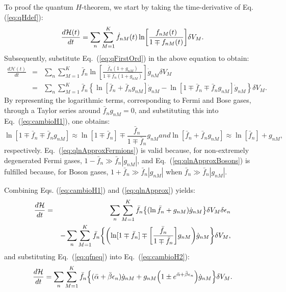 To proof the quantum $H$-theorem, we start by taking the time-derivative of Eq. (\ref{eq:qHdef}):
%
\begin{equation}\label{eq:deltaH}
   \frac{d \mathcal{H} (t)}{dt}= \sum_n \sum_{M=1}^{K} \dot{f}_{nM}(t)\ln \left[ \frac{f_{nM}(t)}{1\mp f_{nM}(t)} \right] \de V_M.
\end{equation}
%
Subsequently, substitute Eq.~(\ref{eq:qFirstOrd}) in the above equation to obtain:
%
\begin{eqnarray}\label{eq:cambioH1}
    \frac{d\mathcal{H} (t)}{dt}&=&
      \sum_n \sum_{M=1}^{K} \bar{f}_{n}\ln \left[
        \frac{\bar{f}_{n}(1+g_{nM})}{1\mp \bar{f}_{n} (1+ g_{nM})}
      \right]\dot{g}_{nM} \delta V_M \nonumber \\
    &=&\sum_n \sum_{M=1}^{K} \bar{f}_n \left \{
      \ln [\bar{f}_n+\bar{f}_n g_{nM}]\dot{g}_{nM}
      -\ln [1\mp\bar{f}_n\mp\bar{f}_n g_{nM}]\dot{g}_{nM}
    \right \}\delta V_M.
\end{eqnarray}
%
By representing the logarithmic terms, corresponding to
Fermi and Bose gases, through a Taylor series around $\bar f_n g_{nM}=0$, and
substituting this into Eq.~(\ref{eq:cambioH1}), one obtains:
%
\begin{subequations}\label{eq:qlnApprox}
\begin{equation}\label{eq:qlnApproxFermions}
	\ln[1\mp\bar{f}_n\mp\bar{f}_n g_{nM}]
    	\approx \ln[1\mp\bar{f}_n]\mp\frac{\bar{f}_n}{1\mp\bar{f}_{n}} g_{nM}
\end{equation}
%
and
%
\begin{equation}\label{eq:qlnApproxBosons}
    \ln [\bar{f}_n+\bar{f}_n g_{nM}] \approx \ln [\bar{f}_n]+ g_{nM},
\end{equation}
\end{subequations}
%
respectively. Eq.~(\ref{eq:qlnApproxFermions}) is valid because, for non-extremely degenerated Fermi gases, 
$1-\bar{f}_n \gg \bar{f}_n|g_{nM}|$, and Eq.~(\ref{eq:qlnApproxBosons}) is fulfilled because,
for Boson gases,
$1+\bar{f}_n \gg \bar{f}_n |g_{nM}|$ when $\bar{f}_n \gg \bar{f}_n |g_{nM}|$.

Combining Eqs. (\ref{eq:cambioH1}) and (\ref{eq:qlnApprox}) yields:
%
\begin{eqnarray}\label{eq:cambioH2}
    \frac{d\mathcal{H}}{dt}&=&\sum_n \sum_{M=1}^{K} \bar{f}_n\left \{ (\ln \bar{f}_n+ g_{nM})\dot{g}_{nM}\right\} \de V_M \delta \epsilon_n \nonumber \\
    &&-\sum_{n}\sum_{M=1}^{K}\bar f_n\left\{ \left( \ln[1\mp\bar{f}_n]\mp \left[\frac{\bar{f}_n}{1\mp\bar{f}_n} \right] g_{nM}\right)\dot{g}_{nM} \right \}\de V_M,
\end{eqnarray}
%
and substituting Eq.~(\ref{eq:qfneq}) into Eq.~(\ref{eq:cambioH2}):
%
\begin{equation}\label{eq:cambioH3}
    \frac{d\mathcal{H}}{dt}=
       \sum_n \sum_{M=1}^{K} \bar{f}_n\left \{
          (\bar{\alpha}+\bar{\beta}{\epsilon}_n)\dot{g}_{nM}
           +g_{nM}\left(1\pm e^{\bar{\alpha}+\bar{\beta}{\epsilon}_n}\right)\dot{g}_{nM}
       \right \} \de V_M.
\end{equation}
%

